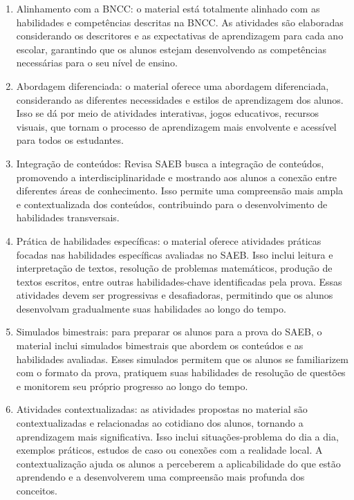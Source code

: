 \begin{enumerate}
\def\labelenumi{\arabic{enumi}.}
\item
  Alinhamento com a BNCC: o material está totalmente alinhado com as
  habilidades e competências descritas na BNCC. As atividades são
  elaboradas considerando os descritores e as expectativas de
  aprendizagem para cada ano escolar, garantindo que os alunos estejam
  desenvolvendo as competências necessárias para o seu nível de ensino.
\item
  Abordagem diferenciada: o material oferece uma abordagem diferenciada,
  considerando as diferentes necessidades e estilos de aprendizagem dos
  alunos. Isso se dá por meio de atividades interativas, jogos
  educativos, recursos visuais, que tornam o processo de aprendizagem
  mais envolvente e acessível para todos os estudantes.
\item
  Integração de conteúdos: Revisa SAEB busca a integração de conteúdos,
  promovendo a interdisciplinaridade e mostrando aos alunos a conexão
  entre diferentes áreas de conhecimento. Isso permite uma compreensão
  mais ampla e contextualizada dos conteúdos, contribuindo para o
  desenvolvimento de habilidades transversais.
\item
  Prática de habilidades específicas: o material oferece atividades
  práticas focadas nas habilidades específicas avaliadas no SAEB. Isso
  inclui leitura e interpretação de textos, resolução de problemas
  matemáticos, produção de textos escritos, entre outras
  habilidades-chave identificadas pela prova. Essas atividades devem ser
  progressivas e desafiadoras, permitindo que os alunos desenvolvam
  gradualmente suas habilidades ao longo do tempo.
\item
  Simulados bimestrais: para preparar os alunos para a prova do SAEB, o
  material inclui simulados bimestrais que abordem os conteúdos e as
  habilidades avaliadas. Esses simulados permitem que os alunos se
  familiarizem com o formato da prova, pratiquem suas habilidades de
  resolução de questões e monitorem seu próprio progresso ao longo do
  tempo.
\item
  Atividades contextualizadas: as atividades propostas no material são
  contextualizadas e relacionadas ao cotidiano dos alunos, tornando a
  aprendizagem mais significativa. Isso inclui situações-problema do dia
  a dia, exemplos práticos, estudos de caso ou conexões com a realidade
  local. A contextualização ajuda os alunos a perceberem a
  aplicabilidade do que estão aprendendo e a desenvolverem uma
  compreensão mais profunda dos conceitos.
\end{enumerate}


